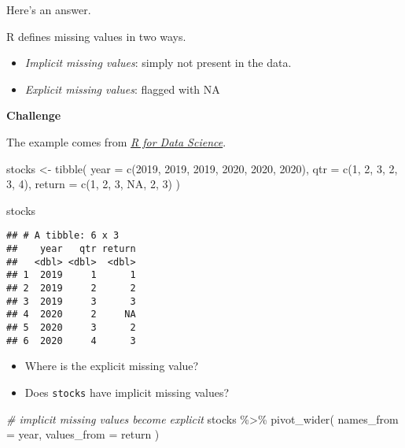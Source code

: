 \documentclass[
]{book}
\newenvironment{Shaded}{\begin{snugshade}}{\end{snugshade}}
\newcommand{\AttributeTok}[1]{\textcolor[rgb]{0.77,0.63,0.00}{#1}}
\newcommand{\CommentTok}[1]{\textcolor[rgb]{0.56,0.35,0.01}{\textit{#1}}}
\newcommand{\ConstantTok}[1]{\textcolor[rgb]{0.00,0.00,0.00}{#1}}
\newcommand{\DecValTok}[1]{\textcolor[rgb]{0.00,0.00,0.81}{#1}}
\newcommand{\FunctionTok}[1]{\textcolor[rgb]{0.00,0.00,0.00}{#1}}
\newcommand{\NormalTok}[1]{#1}
\newcommand{\OtherTok}[1]{\textcolor[rgb]{0.56,0.35,0.01}{#1}}
\newcommand{\SpecialCharTok}[1]{\textcolor[rgb]{0.00,0.00,0.00}{#1}}
\begin{document}
Here's an answer.

R defines missing values in two ways.

\begin{itemize}
\item
  \emph{Implicit missing values}: simply not present in the data.
\item
  \emph{Explicit missing values}: flagged with NA
\end{itemize}

\textbf{Challenge}

The example comes from \href{https://r4ds.had.co.nz/tidy-data.html}{\emph{R for Data Science}}.

\begin{Shaded}
\begin{Highlighting}[]
\NormalTok{stocks }\OtherTok{\textless{}{-}} \FunctionTok{tibble}\NormalTok{(}
  \AttributeTok{year =} \FunctionTok{c}\NormalTok{(}\DecValTok{2019}\NormalTok{, }\DecValTok{2019}\NormalTok{, }\DecValTok{2019}\NormalTok{, }\DecValTok{2020}\NormalTok{, }\DecValTok{2020}\NormalTok{, }\DecValTok{2020}\NormalTok{),}
  \AttributeTok{qtr =} \FunctionTok{c}\NormalTok{(}\DecValTok{1}\NormalTok{, }\DecValTok{2}\NormalTok{, }\DecValTok{3}\NormalTok{, }\DecValTok{2}\NormalTok{, }\DecValTok{3}\NormalTok{, }\DecValTok{4}\NormalTok{),}
  \AttributeTok{return =} \FunctionTok{c}\NormalTok{(}\DecValTok{1}\NormalTok{, }\DecValTok{2}\NormalTok{, }\DecValTok{3}\NormalTok{, }\ConstantTok{NA}\NormalTok{, }\DecValTok{2}\NormalTok{, }\DecValTok{3}\NormalTok{)}
\NormalTok{)}

\NormalTok{stocks}
\end{Highlighting}
\end{Shaded}

\begin{verbatim}
## # A tibble: 6 x 3
##    year   qtr return
##   <dbl> <dbl>  <dbl>
## 1  2019     1      1
## 2  2019     2      2
## 3  2019     3      3
## 4  2020     2     NA
## 5  2020     3      2
## 6  2020     4      3
\end{verbatim}

\begin{itemize}
\item
  Where is the explicit missing value?
\item
  Does \texttt{stocks} have implicit missing values?
\end{itemize}

\begin{Shaded}
\begin{Highlighting}[]
\CommentTok{\# implicit missing values become explicit}
\NormalTok{stocks }\SpecialCharTok{\%\textgreater{}\%}
  \FunctionTok{pivot\_wider}\NormalTok{(}
    \AttributeTok{names\_from =}\NormalTok{ year,}
    \AttributeTok{values\_from =}\NormalTok{ return}
\NormalTok{  )}
\end{Highlighting}
\end{Shaded}
\end{document}
